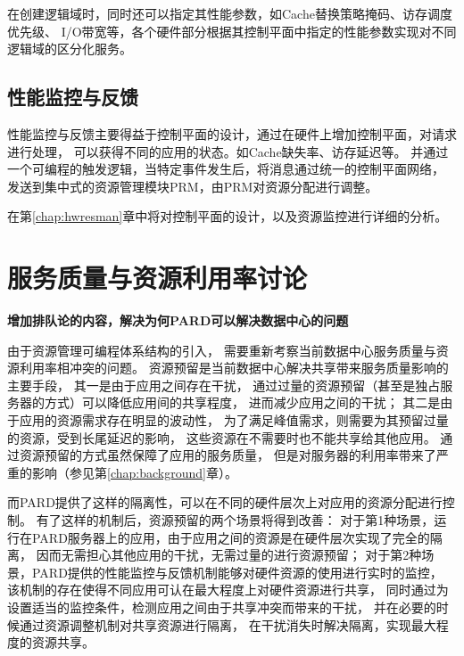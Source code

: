 在创建逻辑域时，同时还可以指定其性能参数，如Cache替换策略掩码、访存调度优先级、
I/O带宽等，各个硬件部分根据其控制平面中指定的性能参数实现对不同逻辑域的区分化服务。



\subsection{性能监控与反馈}

性能监控与反馈主要得益于控制平面的设计，通过在硬件上增加控制平面，对请求进行处理，
可以获得不同的应用的状态。如Cache缺失率、访存延迟等。
并通过一个可编程的触发逻辑，当特定事件发生后，将消息通过统一的控制平面网络，
发送到集中式的资源管理模块PRM，由PRM对资源分配进行调整。

在第\ref{chap:hwresman}章中将对控制平面的设计，以及资源监控进行详细的分析。


\fi


\section{服务质量与资源利用率讨论}

\textbf{增加排队论的内容，解决为何PARD可以解决数据中心的问题}

由于资源管理可编程体系结构的引入，
需要重新考察当前数据中心服务质量与资源利用率相冲突的问题。
资源预留是当前数据中心解决共享带来服务质量影响的主要手段，
其一是由于应用之间存在干扰，
通过过量的资源预留（甚至是独占服务器的方式）可以降低应用间的共享程度，
进而减少应用之间的干扰；
其二是由于应用的资源需求存在明显的波动性，
为了满足峰值需求，则需要为其预留过量的资源，受到长尾延迟的影响，
这些资源在不需要时也不能共享给其他应用。
通过资源预留的方式虽然保障了应用的服务质量，
但是对服务器的利用率带来了严重的影响（参见第\ref{chap:background}章）。


而PARD提供了这样的隔离性，可以在不同的硬件层次上对应用的资源分配进行控制。
有了这样的机制后，资源预留的两个场景将得到改善：
对于第1种场景，运行在PARD服务器上的应用，由于应用之间的资源是在硬件层次实现了完全的隔离，
因而无需担心其他应用的干扰，无需过量的进行资源预留；
对于第2种场景，PARD提供的性能监控与反馈机制能够对硬件资源的使用进行实时的监控，
该机制的存在使得不同应用可认在最大程度上对硬件资源进行共享，
同时通过为设置适当的监控条件，检测应用之间由于共享冲突而带来的干扰， 
并在必要的时候通过资源调整机制对共享资源进行隔离，
在干扰消失时解决隔离，实现最大程度的资源共享。

